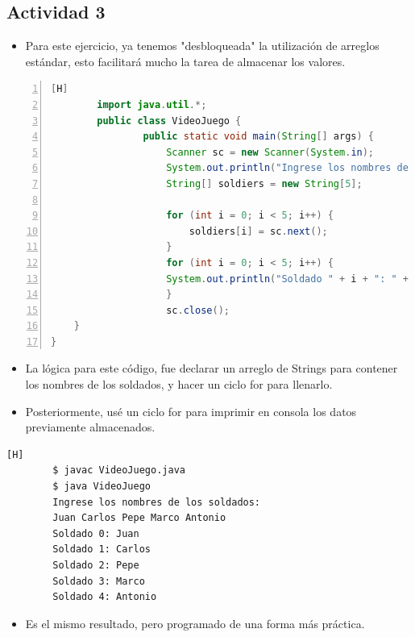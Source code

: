 \documentclass{article}
\begin{document}
	\subsection{Actividad 3}
	\begin{itemize}
		\item Para este ejercicio, ya tenemos "desbloqueada" la utilización de arreglos estándar, esto facilitará mucho la tarea de almacenar los valores.
	\end{itemize}
	\begin{lstlisting}[language=java,caption={Los 5 soldados, pero con arreglos}, numbers=left][H]
		import java.util.*;
		public class VideoJuego {
    			public static void main(String[] args) {
        			Scanner sc = new Scanner(System.in);
        			System.out.println("Ingrese los nombres de los soldados");
        			String[] soldiers = new String[5];

        			for (int i = 0; i < 5; i++) {
            			soldiers[i] = sc.next();
        			}
        			for (int i = 0; i < 5; i++) {
            		System.out.println("Soldado " + i + ": " + soldiers[i]);
        			}
        			sc.close();
    }
}
	\end{lstlisting}
	\begin{itemize}
		\item La lógica para este código, fue declarar un arreglo de Strings para contener los nombres de los soldados, y hacer un ciclo for para llenarlo.
		\item Posteriormente, usé un ciclo for para imprimir en consola los datos previamente almacenados.
	\end{itemize}
	\begin{lstlisting}[language=bash,caption={Probando con arreglos}][H]
		$ javac VideoJuego.java
		$ java VideoJuego
		Ingrese los nombres de los soldados:
		Juan Carlos Pepe Marco Antonio
		Soldado 0: Juan
		Soldado 1: Carlos
		Soldado 2: Pepe
		Soldado 3: Marco
		Soldado 4: Antonio
	\end{lstlisting}
	\begin{itemize}
		\item Es el mismo resultado, pero programado de una forma más práctica.
	\end{itemize}
\end{document}
